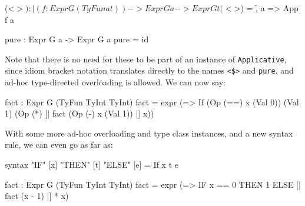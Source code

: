 \begin{code}
(<$>) : |(f : Expr G (TyFun a t)) -> Expr G a -> Expr G t
(<$>) = \f, a => App f a

pure : Expr G a -> Expr G a
pure = id
\end{code} 

\noindent
Note that there is no need for these to be part of an instance of \texttt{Applicative}, since idiom bracket notation translates directly to the names \texttt{<\$>} and \texttt{pure}, and ad-hoc type-directed overloading is allowed.
We can now say:

\begin{code}
fact : Expr G (TyFun TyInt TyInt)
fact = expr (\x => If (Op (==) x (Val 0))
                      (Val 1) (Op (*) [| fact (Op (-) x (Val 1)) |] x))
\end{code} 

\noindent
With some more ad-hoc overloading and type class instances, and a new syntax rule, we can even go as far as:

\begin{code}
syntax "IF" [x] "THEN" [t] "ELSE" [e] = If x t e

fact : Expr G (TyFun TyInt TyInt)
fact = expr (\x => IF x == 0 THEN 1 ELSE [| fact (x - 1) |] * x)
\end{code} 

